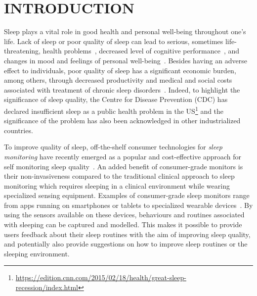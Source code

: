 \section{INTRODUCTION}\label{sec:1introduction}

Sleep plays a vital role in good health and personal well-being throughout one's life. Lack of sleep or poor quality of sleep can lead to
serious, sometimes life-threatening, health problems~\cite{altena2008sleep,chandola2010effect,lallukka2016contribution}, decreased level of 
cognitive performance~\cite{alhola07sleep,akerstedt07altered}, and changes in mood and feelings of personal well-being~\cite{paunio09longitudinal,pilcher97sleep}. 
Besides having an adverse effect to individuals, poor quality of sleep has a significant economic burden, among others, through decreased productivity and medical and social costs 
associated with treatment of chronic sleep disorders~\cite{hafner17why}. Indeed, to highlight the significance of sleep quality, the Centre for Disease Prevention (CDC) has declared insufficient sleep 
as a public health problem in the US\footnote{\url{https://edition.cnn.com/2015/02/18/health/great-sleep-recession/index.html}} and the significance of the problem has also been 
acknowledged in other industrialized countries. 

To improve quality of sleep, off-the-shelf consumer technologies for \emph{sleep monitoring} have recently emerged as a popular and cost-effective approach for self monitoring sleep quality~\cite{ko15consumer}. An added benefit of consumer-grade monitors is their non-invasiveness compared to the traditional clinical approach to sleep monitoring which requires sleeping in a clinical environment while wearing specialized sensing equipment. Examples of consumer-grade sleep monitors range from apps running on smartphones or tablets to specialized wearable devices~\cite{zeo,Jawbone,SleepAndroid,fitbit,gu2016sleep,sleepmonitor}. By using the sensors available on these devices, behaviours and routines associated with sleeping can be captured and modelled. This makes it possible to provide users feedback about their sleep routines with the aim of improving sleep quality, and potentially also provide suggestions on how to improve sleep routines or the sleeping environment. 


